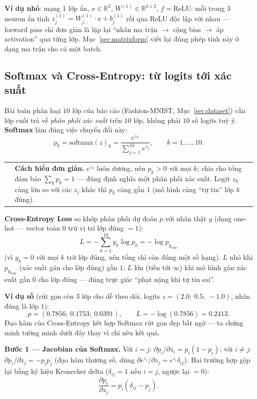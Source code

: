 \documentclass[12pt,a4paper]{report}
\makeatletter
\newenvironment{tructiep}[1][Cách hiểu đơn giản]
  {\par\smallskip\noindent\begin{tabular}{@{}p{0.35em}@{\hspace{6pt}}p{\dimexpr\linewidth-1.9em\relax}@{}}
   \textcolor{boxln}{\rule{2pt}{\baselineskip}} & \textbf{#1.}\enspace\ignorespaces}
  {\end{tabular}\par\smallskip}
\makeatother
\begin{document}
\textbf{Ví dụ nhỏ}: mạng 1 lớp ẩn, $x\in\mathbb R^2$,
$W^{(1)}\in\mathbb R^{3\times2}$, $f=\mathrm{ReLU}$: mỗi trong 3 neuron ẩn
tính $z^{(1)}_j = W^{(1)}_{j,:}\cdot x + b^{(1)}_j$ rồi qua ReLU độc lập
với nhau --- forward pass chỉ đơn giản là lặp lại ``nhân ma trận $\to$ cộng
bias $\to$ áp activation'' qua từng lớp. Mục~\ref{sec:matrixform} viết lại
đúng phép tính này ở dạng ma trận cho cả một batch.

\subsection{Softmax và Cross-Entropy: từ logits tới xác suất}
\label{sec:softmax}

Bài toán phân loại $10$ lớp của báo cáo (Fashion-MNIST, Mục~\ref{sec:dataset})
cần lớp cuối trả về \emph{phân phối xác suất} trên $10$ lớp, không phải
$10$ số logits tuỳ ý. \textbf{Softmax} làm đúng việc chuyển đổi này:
$$p_k = \mathrm{softmax}(z)_k = \frac{e^{z_k}}{\sum_{j=1}^{10} e^{z_j}}, \qquad k=1,\ldots,10.$$

\begin{tructiep}
$e^{z_k}$ luôn dương, nên $p_k>0$ với mọi $k$; chia cho tổng đảm bảo
$\sum_k p_k=1$ --- đúng định nghĩa một phân phối xác suất. Logit $z_k$
càng lớn so với các $z_j$ khác thì $p_k$ càng gần $1$ (mô hình càng ``tự
tin'' lớp $k$ đúng).
\end{tructiep}

\textbf{Cross-Entropy Loss} so khớp phân phối dự đoán $p$ với nhãn thật
$y$ (dạng one-hot --- vector toàn $0$ trừ vị trí lớp đúng $=1$):
$$L = -\sum_{k=1}^{10} y_k\log p_k = -\log p_{y_{\text{true}}}$$
(vì $y_k=0$ với mọi $k$ trừ lớp đúng, nên tổng chỉ còn đúng một số hạng).
$L$ nhỏ khi $p_{y_{\text{true}}}$ (xác suất gán cho lớp đúng) gần $1$; $L$
lớn (tiến tới $\infty$) khi mô hình gán xác suất gần $0$ cho lớp đúng ---
đúng trực giác ``phạt nặng khi tự tin sai''.

\textbf{Ví dụ số} (rút gọn còn $3$ lớp cho dễ theo dõi, logits
$z=(2.0;\ 0.5;\ -1.0)$, nhãn đúng là lớp $1$):
$$p = (0.7856;\ 0.1753;\ 0.0391), \qquad L=-\log(0.7856)=0.2413.$$
Đạo hàm của Cross-Entropy kết hợp Softmax rút gọn đẹp bất ngờ --- ta chứng
minh tường minh dưới đây thay vì chỉ nêu kết quả.

\textbf{Bước 1 --- Jacobian của Softmax.} Với $i=j$:
$\partial p_i/\partial z_i = p_i(1-p_i)$; với $i\ne j$:
$\partial p_i/\partial z_j = -p_ip_j$ (đạo hàm thương số, dùng
$\partial e^{z_i}/\partial z_j=e^{z_i}\delta_{ij}$). Hai trường hợp gộp
lại bằng ký hiệu Kronecker delta ($\delta_{ij}=1$ nếu $i=j$, ngược lại
$=0$):
$$\frac{\partial p_i}{\partial z_j} = p_i(\delta_{ij}-p_j).$$
\end{document}
